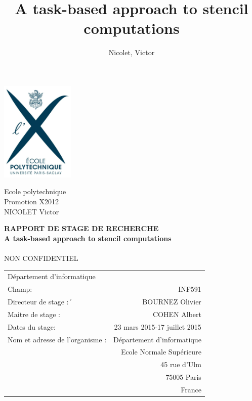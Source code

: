 \documentclass[a4paper,11pt]{article}
\title{A task-based approach to stencil computations}
\author{Nicolet, Victor}
\begin{document}
\begin{minipage}{3.5cm}
  \includegraphics[width=3.5cm]{logox.jpg}
  \begin{center}
  Ecole polytechnique\\
  Promotion X2012\\
  NICOLET Victor
  \end{center}
\end{minipage}

\vspace{3cm}

\begin{center}

{\Large \textbf{RAPPORT DE STAGE DE RECHERCHE}}\\
\vspace{1cm}
{\Large\textbf{A task-based approach to stencil computations}}\\
\makebox{\rule{12cm}{0.4pt}}\\
\vspace{1cm}
{\large NON CONFIDENTIEL}\\

\end{center}
\vspace{4cm}
\begin{tabular}{p{}r}
 D\'epartement d'informatique & \\
 Champ: & INF591 \\
 Directeur de stage :´& BOURNEZ Olivier \\
 Maitre de stage :& COHEN Albert \\
 Dates du stage: & 23 mars 2015-17 juillet 2015 \\
 Nom et adresse de l'organisme : & D\'epartement d'informatique \\
 & Ecole Normale Sup\'erieure \\
 & 45 rue d'Ulm \\
 & 75005 Paris \\
 & France
\end{tabular}
\end{document}
